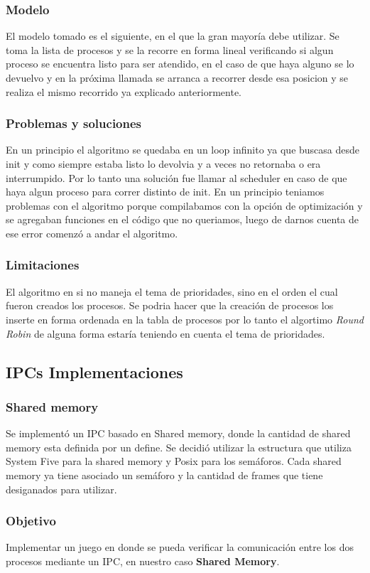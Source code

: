 \documentclass[10pt,a4paper]{article}
\begin{document}
	\subsubsection{Modelo}
		El modelo tomado es el siguiente, en el que la gran mayor\'ia debe utilizar. Se toma la lista de procesos y se la recorre en forma lineal verificando si algun proceso se encuentra listo para ser atendido, en el caso de que haya alguno se lo devuelvo y en la pr\'oxima llamada se arranca a recorrer desde esa posicion y se realiza el mismo recorrido ya explicado anteriormente.
	\subsubsection{Problemas y soluciones}
		En un principio el algoritmo se quedaba en un loop infinito ya que buscasa desde init y como siempre estaba listo lo devolvia y a veces no retornaba o era interrumpido. Por lo tanto una soluci\'on fue llamar al scheduler en caso de que haya algun proceso para correr distinto de init. En un principio teniamos problemas con el algoritmo porque compilabamos con la opci\'on de optimizaci\'on y se agregaban funciones en el c\'odigo que no queriamos, luego de darnos cuenta de ese error comenz\'o a andar el algoritmo.
	\subsubsection{Limitaciones}
		El algoritmo en si no maneja el tema de prioridades, sino en el orden el cual fueron creados los procesos. Se podria hacer que la creaci\'on de procesos los inserte en forma ordenada en la tabla de procesos por lo tanto el algortimo \textit{Round Robin} de alguna forma estar\'ia teniendo en cuenta el tema de prioridades.

\subsection{IPCs Implementaciones}
	\subsubsection{Shared memory}
		Se implement\'o un IPC basado en Shared memory, donde la cantidad de shared memory esta definida por un define. Se decidi\'o utilizar la estructura que utiliza System Five para la shared memory y Posix para los sem\'aforos. Cada shared memory ya tiene asociado un sem\'aforo y la cantidad de frames que tiene desiganados para utilizar.
	\subsubsection{Objetivo}
		Implementar un juego en donde se pueda verificar la comunicaci\'on entre los dos procesos mediante un IPC, en nuestro caso \textbf{Shared Memory}.
\end{document}
